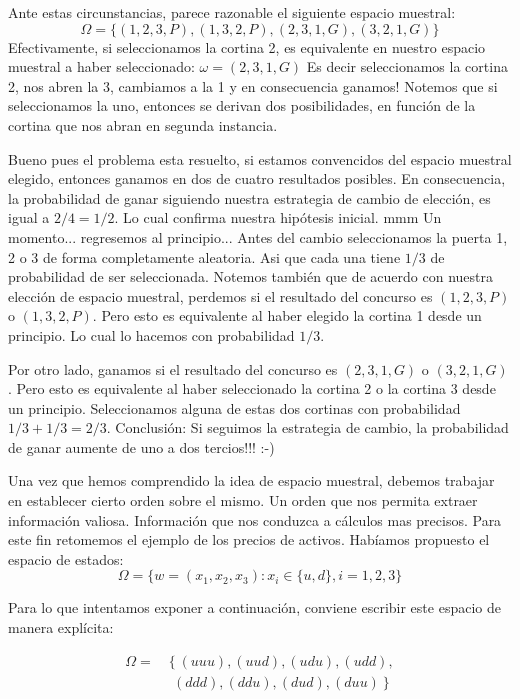 \documentclass[14pt]{extreport}
\newcounter{ejemplo}[chapter]
\begin{document}
Ante estas circunstancias, parece razonable el
siguiente espacio muestral: 
$$\Omega = \{(1, 2, 3, P), (1, 3, 2, P), (2, 3, 1,
G ), (3, 2, 1, G )\}$$
 Efectivamente, si seleccionamos la cortina 2, es
equivalente en nuestro espacio muestral a haber seleccionado: $\omega = (2, 3,
1, G )$ Es decir seleccionamos la cortina 2, nos abren la 3, cambiamos a
la 1 y en consecuencia ganamos! Notemos que si seleccionamos la uno,
entonces se derivan dos posibilidades, en función de la cortina que nos
abran en segunda instancia.

Bueno pues el problema esta resuelto, si estamos
convencidos del espacio muestral elegido, entonces ganamos en dos de cuatro resultados posibles. En consecuencia, la probabilidad de ganar siguiendo nuestra estrategia de cambio de elección, es igual a $2/4 = 1/2$. Lo cual confirma nuestra hipótesis inicial. mmm Un momento... regresemos al principio... Antes del cambio seleccionamos la puerta 1, 2 o 3 de forma completamente aleatoria. Asi que cada una tiene $1/3$ de probabilidad de ser seleccionada. Notemos también que de acuerdo con
nuestra elección de espacio muestral, perdemos si el resultado del concurso es $(1, 2, 3, P)$ o $(1, 3, 2, P)$. Pero esto es equivalente al haber elegido la cortina 1 desde un principio. Lo cual lo hacemos con
probabilidad $1/3$.

Por otro lado, ganamos si el resultado del concurso es
$(2, 3, 1, G )$ o $(3, 2, 1, G )$. Pero esto es equivalente al haber seleccionado la cortina 2 o la cortina 3 desde un principio.
Seleccionamos alguna de estas dos cortinas con probabilidad $1/3 + 1/3 = 2/3$. Conclusión: Si seguimos la estrategia de cambio, la probabilidad de ganar aumente de uno a dos tercios!!! :-)

\noindent\hrulefill

Una vez que hemos comprendido la idea de espacio muestral,
debemos trabajar en establecer cierto orden sobre el mismo. Un orden que
nos permita extraer información valiosa. Información que nos conduzca a
cálculos mas precisos. Para este fin retomemos el ejemplo de los precios
de activos. Habíamos propuesto el espacio de estados: 
$$
\Omega = \{w = (x_1, x_2, x_3 ) : x_i \in \{u, d\}, i = 1, 2, 3\} 
$$

Para lo que intentamos exponer a continuación, conviene escribir este espacio de manera explícita: 

\begin{equation*}
\begin{split}
\Omega = & \left\{(uuu), (uud), (udu), (udd), \right.\\
         & \phantom{\{}\left.(ddd), (ddu),(dud), (duu)\right\}
\end{split}
\end{equation*}
\end{document}
